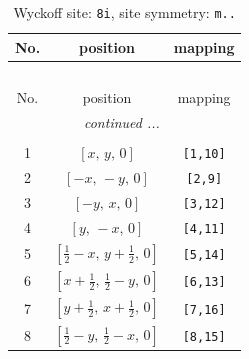 \documentclass[fleqn,8pt]{jsarticle}
\begin{document}
\renewcommand{\arraystretch}{1.2}
\begin{longtable}{ccc}
\caption{Wyckoff site: {\tt 8i}, site symmetry: {\tt m..}}
 \\
 \hline \hline
No. & position & mapping \\ \hline \endfirsthead

\multicolumn{2}{l}{\tablename\ \thetable{}} \\
 \hline \hline
No. & position & mapping \\ \hline \endhead

 \hline \hline
\multicolumn{2}{r}{\footnotesize\it continued ...} \\ \endfoot

 \hline \hline
\multicolumn{2}{r}{} \\ \endlastfoot

1 & $\left[ x,\, y,\, 0 \right]$ & {\tt [1,10]} \\ \hline
2 & $\left[ - x,\, - y,\, 0 \right]$ & {\tt [2,9]} \\ \hline
3 & $\left[ - y,\, x,\, 0 \right]$ & {\tt [3,12]} \\ \hline
4 & $\left[ y,\, - x,\, 0 \right]$ & {\tt [4,11]} \\ \hline
5 & $\left[ \frac{1}{2} - x,\, y + \frac{1}{2},\, 0 \right]$ & {\tt [5,14]} \\ \hline
6 & $\left[ x + \frac{1}{2},\, \frac{1}{2} - y,\, 0 \right]$ & {\tt [6,13]} \\ \hline
7 & $\left[ y + \frac{1}{2},\, x + \frac{1}{2},\, 0 \right]$ & {\tt [7,16]} \\ \hline
8 & $\left[ \frac{1}{2} - y,\, \frac{1}{2} - x,\, 0 \right]$ & {\tt [8,15]} \\
\end{longtable}
\renewcommand{\arraystretch}{1.2}
\end{document}
